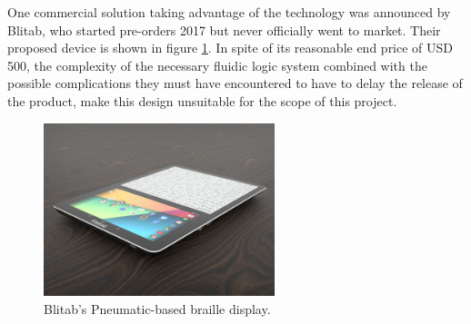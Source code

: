 One commercial solution taking advantage of the technology was announced by Blitab, who started pre-orders 2017 but never officially went to market. Their proposed device is shown in figure \ref{fig:Blitab-product}.
In spite of its reasonable end price of USD 500, the complexity of the necessary fluidic logic system combined with the possible complications they must have encountered to have to delay the release of the product, make this design unsuitable for the scope of this project.

\begin{figure}\centering
    \includegraphics[width=0.6\textwidth]{figures/Blitab_product.jpg}
\caption{Blitab's Pneumatic-based braille display.}
\label{fig:Blitab-product}
\end{figure}